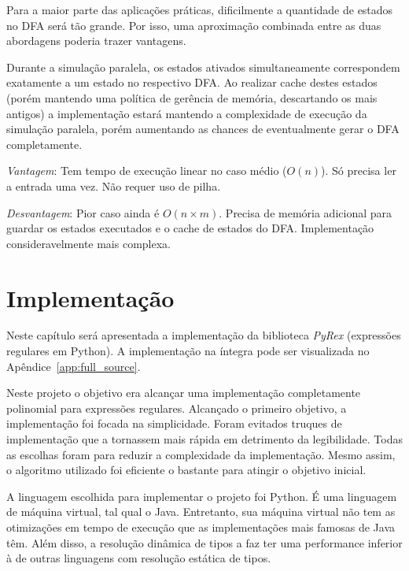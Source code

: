 \documentclass[a4paper,12pt,oneside,onecolumn]{uerj}
\begin{document}
Para a maior parte das aplicações práticas, dificilmente a quantidade de estados no DFA será tão grande. Por isso, uma aproximação combinada entre as duas abordagens poderia trazer vantagens.

Durante a simulação paralela, os estados ativados simultaneamente correspondem exatamente a um estado no respectivo DFA. Ao realizar cache destes estados (porém mantendo uma política de gerência de memória, descartando os mais antigos) a implementação estará mantendo a complexidade de execução da simulação paralela, porém aumentando as chances de eventualmente gerar o DFA completamente.

\emph{Vantagem}: Tem tempo de execução linear no caso médio ($O(n)$). Só precisa ler a entrada uma vez. Não requer uso de pilha.

\emph{Desvantagem}: Pior caso ainda é $O(n \times m)$. Precisa de memória adicional para guardar os estados executados e o cache de estados do DFA. Implementação consideravelmente mais complexa.

\chapter{Implementação}\label{cap:implementation}

Neste capítulo será apresentada a implementação da biblioteca \emph{PyRex} (expressões regulares em Python). A implementação na íntegra pode ser visualizada no Apêndice~\ref{app:full_source}.

Neste projeto o objetivo era alcançar uma implementação completamente polinomial para expressões regulares. Alcançado o primeiro objetivo, a implementação foi focada na simplicidade. Foram evitados truques de implementação que a tornassem mais rápida em detrimento da legibilidade. Todas as escolhas foram para reduzir a complexidade da implementação. Mesmo assim, o algoritmo utilizado foi eficiente o bastante para atingir o objetivo inicial.

A linguagem escolhida para implementar o projeto foi Python. É uma linguagem de máquina virtual, tal qual o Java. Entretanto, sua máquina virtual não tem as otimizações em tempo de execução que as implementações mais famosas de Java têm. Além disso, a resolução dinâmica de tipos a faz ter uma performance inferior à de outras linguagens com resolução estática de tipos. 
\end{document}
